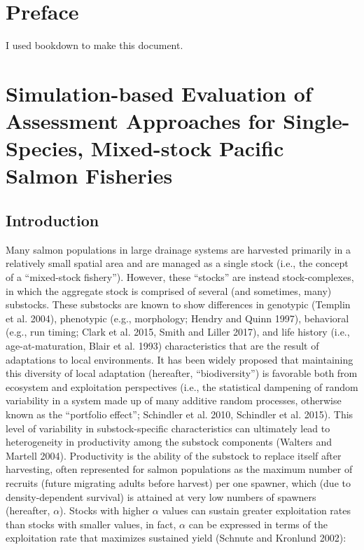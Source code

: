 \documentclass[12pt,]{book}
\theoremstyle{definition}
\theoremstyle{definition}
\theoremstyle{definition}
\theoremstyle{remark}
\begin{document}
\setlength{\parskip}{0pt plus 0pt minus 0pt}

\doublespacing

\chapter*{Preface}\label{preface}

I used bookdown \citep{xie-2015} to make this document.

\chapter{Simulation-based Evaluation of Assessment Approaches for
Single-Species, Mixed-stock Pacific Salmon Fisheries}\label{ch4}

\section{Introduction}\label{introduction}

\noindent
Many salmon populations in large drainage systems are harvested
primarily in a relatively small spatial area and are managed as a single
stock (i.e., the concept of a ``mixed-stock fishery''). However, these
``stocks'' are instead stock-complexes, in which the aggregate stock is
comprised of several (and sometimes, many) substocks. These substocks
are known to show differences in genotypic (Templin et al. 2004),
phenotypic (e.g., morphology; Hendry and Quinn 1997), behavioral (e.g.,
run timing; Clark et al. 2015, Smith and Liller 2017), and life history
(i.e., age-at-maturation, Blair et al. 1993) characteristics that are
the result of adaptations to local environments. It has been widely
proposed that maintaining this diversity of local adaptation (hereafter,
``biodiversity'') is favorable both from ecosystem and exploitation
perspectives (i.e., the statistical dampening of random variability in a
system made up of many additive random processes, otherwise known as the
``portfolio effect''; Schindler et al. 2010, Schindler et al. 2015).
This level of variability in substock-specific characteristics can
ultimately lead to heterogeneity in productivity among the substock
components (Walters and Martell 2004). Productivity is the ability of
the substock to replace itself after harvesting, often represented for
salmon populations as the maximum number of recruits (future migrating
adults before harvest) per one spawner, which (due to density-dependent
survival) is attained at very low numbers of spawners (hereafter,
\(\alpha\)). Stocks with higher \(\alpha\) values can sustain greater
exploitation rates than stocks with smaller values, in fact, \(\alpha\)
can be expressed in terms of the exploitation rate that maximizes
sustained yield (Schnute and Kronlund 2002):
\end{document}
